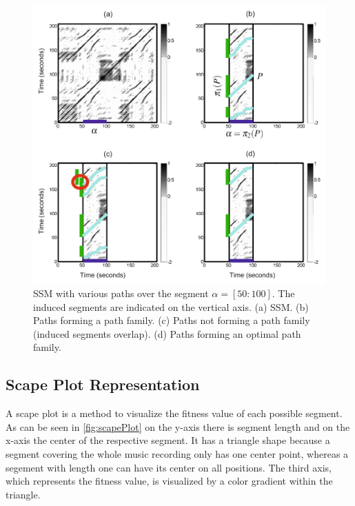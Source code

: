 \documentclass[a4paper, 9pt, twocolumn]{extarticle}
\begin{document}
\begin{figure}[h]
\centering
  \includegraphics[width=\linewidth]{images/pathFamilies.png}
	\caption{SSM with various paths over the segment $\alpha=[50:100]$. The induced segments are indicated on the vertical axis. (a) SSM. (b) Paths forming a path family. (c) Paths not forming a path family (induced segments overlap). (d) Paths forming an optimal path family.}
	\label{fig:pathFamilies}
\end{figure}

\subsection{Scape Plot Representation}
\label{subsection:scapePlot}

A scape plot is a method to visualize the fitness value of each possible segment. As can be seen in 
\autoref{fig:scapePlot} on the y-axis there is segment length and on the x-axis the center of the
respective segment. It has a triangle shape because a segment covering the whole music recording only has one center point, whereas a segement with length one can have its center on all positions.
The third axis, which represents the fitness value, is visualized by a color gradient within the
triangle.
\end{document}
